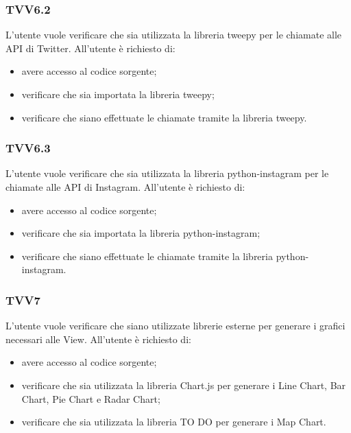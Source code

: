 		\subsubsection{TVV6.2}
			L'utente vuole verificare che sia utilizzata la libreria tweepy per le chiamate alle API di Twitter. All'utente è richiesto di:
			\begin{itemize}
				\item avere accesso al codice sorgente;
				\item verificare che sia importata la libreria tweepy;
				\item verificare che siano effettuate le chiamate tramite la libreria tweepy.
			\end{itemize}
			
		\subsubsection{TVV6.3}
			L'utente vuole verificare che sia utilizzata la libreria python-instagram per le chiamate alle API di Instagram. All'utente è richiesto di:
			\begin{itemize}
				\item avere accesso al codice sorgente;
				\item verificare che sia importata la libreria python-instagram;
				\item verificare che siano effettuate le chiamate tramite la libreria python-instagram.
			\end{itemize}
			
		\subsubsection{TVV7}
			L'utente vuole verificare che siano utilizzate librerie esterne per generare i grafici necessari alle View. All'utente è richiesto di:
			\begin{itemize}
				\item avere accesso al codice sorgente;
				\item verificare che sia utilizzata la libreria Chart.js per generare i Line Chart, Bar Chart, Pie Chart e Radar Chart;
				\item verificare che sia utilizzata la libreria TO DO per generare i Map Chart.
			\end{itemize}
			
